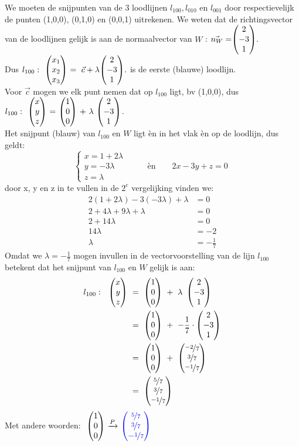 
We moeten  de snijpunten van de 3 loodlijnen $ l_{100}, l_{010} $ en $ l_{001}  $ door respectievelijk de punten (1,0,0), (0,1,0) en (0,0,1) uitrekenen. We weten dat de richtingsvector van de loodlijnen gelijk is aan de normaalvector van $W$ : $\vec{n_W} = \vecdrie{2}{-3}{1}. $ \\ 
Dus  $ l_{100}: \ \ \vecdriesnel{x} \ = \  \vec{c} + \lambda \vecdrie{2}{-3}{1}. $ is de eerste (blauwe) loodlijn. \\
Voor $ \vec{c} $ mogen we elk punt  nemen dat op  $ l_{100} $ ligt, bv  (1,0,0), dus \\
$ l_{100}: \ \ \vecdrie{x}{y}{z} \ = \ \vecdrie{1}{0}{0} \ + \ \lambda \ \vecdrie{2}{-3}{1} $. \\ 
Het snijpunt (blauw) van $ l_{100} $ en $W$  ligt èn in het vlak  èn op de loodlijn, dus geldt:
\[\begin{cases}
    x = 1 + 2\lambda  \\
    y= -3\lambda   \qquad \qquad \text{èn} \qquad  2x-3y+z = 0 \\
    z= \lambda 
\end{cases}
\] 
door x, y en z in te  vullen in de $ 2^e $  vergelijking vinden we:
\begin{align*}
    2(1 + 2\lambda) - 3 (-3\lambda) + \lambda &= 0 \\
    2 + 4\lambda +9\lambda + \lambda &= 0 \\
    2+ 14\lambda  &= 0 \\
    14\lambda  &= -2 \\
    \lambda &= -\frac{1}{7}    
\end{align*}
Omdat we  $\lambda = -\frac{1}{7} $ mogen invullen in  de vectorvoorstelling van de lijn $ l_{100} $ betekent dat het snijpunt van $ l_{100} $ en $W$ gelijk is aan:
\begin{align*}
    l_{100}: \ \ \matdrie{x}{y}{z} \ &= \ \matdrie{1}{0}{0}  \ + \ \lambda \ \matdrie{2}{-3}{1}  \\
      &= \ \matdrie{1}{0}{0} \ + \ -\frac{1}{7} \cdot \matdrie{2}{-3}{1} \\
       &= \ \matdrie{1}{0}{0} \ + \ \matdrie{\nicefrac{-2}{7}}{\nicefrac{3}{7}}{\nicefrac{-1}{7}} \\
       &= \ \matdrie{\nicefrac{5}{7}}{\nicefrac{3}{7}}{\nicefrac{-1}{7}}
\end{align*}
Met andere woorden:
$ \ \vecdrie{1}{0}{0}   \  \xrightarrow{P}  \  \vecdrie[blue] {\nicefrac{5}{7} }{\nicefrac{3}{7} }{-\nicefrac{1}{7} }\ $

